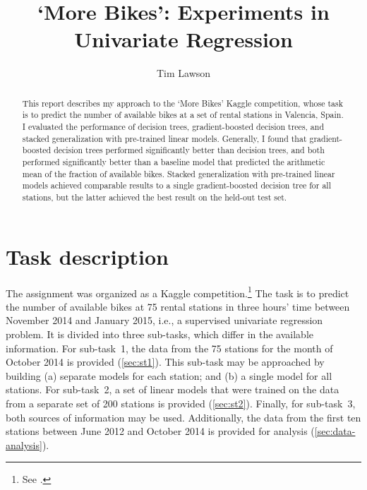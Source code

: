 \documentclass[11pt]{extarticle}
\begin{document}
\fancyhf{}
\fancyfoot[C]{\thepage}

\title{`More Bikes': Experiments in Univariate Regression}
\author[]{Tim Lawson}
\date{}

\maketitle

\begin{abstract}
  This report describes my approach to the `More Bikes' Kaggle competition, whose task is
  to predict the number of available bikes at a set of rental stations in Valencia,
  Spain.
  I evaluated the performance of decision trees, gradient-boosted decision trees, and
  stacked generalization with pre-trained linear models.
  Generally, I found that gradient-boosted decision trees performed significantly better
  than decision trees, and both performed significantly better than a baseline model that
  predicted the arithmetic mean of the fraction of available bikes.
  Stacked generalization with pre-trained linear models achieved comparable results to a
  single gradient-boosted decision tree for all stations, but the latter achieved the
  best result on the held-out test set.
\end{abstract}

\section{Task description}
\label{sec:task-description}

The assignment was organized as a Kaggle competition.\footnote{See .
}
The task is to predict the number of available bikes at 75 rental stations in three
hours' time between November 2014 and January 2015, i.e., a supervised univariate
regression problem.
It is divided into three sub-tasks, which differ in the available information.
For sub-task~1, the data from the 75 stations for the month of October 2014 is provided
(\cref{sec:st1}).
This sub-task may be approached by building (a) separate models for each station; and
(b) a single model for all stations.
For sub-task~2, a set of linear models that were trained on the data from a separate
set of 200 stations is provided (\cref{sec:st2}).
Finally, for sub-task~3, both sources of information may be used.
Additionally, the data from the first ten stations between June 2012 and October 2014
is provided for analysis (\cref{sec:data-analysis}).
\end{document}
